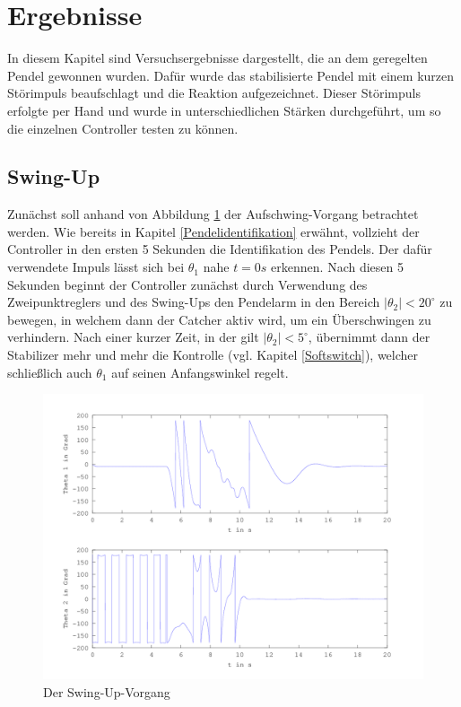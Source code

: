 \section{Ergebnisse}
In diesem Kapitel sind Versuchsergebnisse dargestellt, die an dem geregelten Pendel gewonnen wurden. Dafür wurde das stabilisierte Pendel mit einem kurzen Störimpuls beaufschlagt und die Reaktion aufgezeichnet. Dieser Störimpuls erfolgte per Hand und wurde in unterschiedlichen Stärken durchgeführt, um so die einzelnen Controller testen zu können. 
\subsection{Swing-Up}
Zunächst soll anhand von Abbildung \ref{fig.Swing-Up-Plot} der Aufschwing-Vorgang betrachtet werden. Wie bereits in Kapitel \ref{Pendelidentifikation} erwähnt, vollzieht der Controller in den ersten 5 Sekunden die Identifikation des Pendels. Der dafür verwendete Impuls lässt sich bei $\theta_1$ nahe $t=0s$ erkennen. Nach diesen 5 Sekunden beginnt der Controller zunächst durch Verwendung des Zweipunktreglers und des Swing-Ups den Pendelarm in den Bereich $\left| \theta_2 \right| < 20^\circ$ zu bewegen, in welchem dann der Catcher aktiv wird, um ein Überschwingen zu verhindern. Nach einer kurzer Zeit, in der gilt $\left| \theta_2 \right| < 5^\circ$, übernimmt dann der Stabilizer mehr und mehr die Kontrolle (vgl. Kapitel \ref{Softswitch}), welcher schließlich auch $\theta_1$ auf seinen Anfangswinkel regelt.

\begin{figure}[htbp]
	\centering
	\includegraphics[width=1.\textwidth]{Grafiken/Swingup_kurz.png}
	\caption{Der Swing-Up-Vorgang}
	\label{fig.Swing-Up-Plot}
\end{figure}


